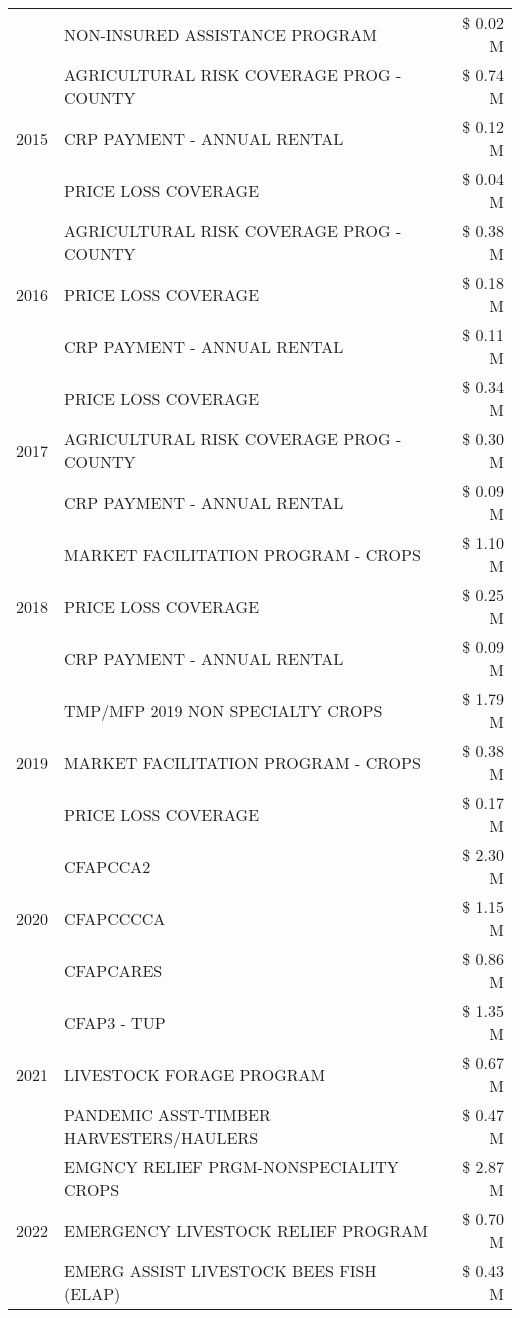 \begin{tabular}{llr}
 & NON-INSURED ASSISTANCE PROGRAM & \$ 0.02 M \\
\cline{1-3}
\multirow[t]{3}{*}{2015} & AGRICULTURAL RISK COVERAGE PROG - COUNTY & \$ 0.74 M \\
 & CRP PAYMENT - ANNUAL RENTAL & \$ 0.12 M \\
 & PRICE LOSS COVERAGE & \$ 0.04 M \\
\cline{1-3}
\multirow[t]{3}{*}{2016} & AGRICULTURAL RISK COVERAGE PROG - COUNTY & \$ 0.38 M \\
 & PRICE LOSS COVERAGE & \$ 0.18 M \\
 & CRP PAYMENT - ANNUAL RENTAL & \$ 0.11 M \\
\cline{1-3}
\multirow[t]{3}{*}{2017} & PRICE LOSS COVERAGE & \$ 0.34 M \\
 & AGRICULTURAL RISK COVERAGE PROG - COUNTY & \$ 0.30 M \\
 & CRP PAYMENT - ANNUAL RENTAL & \$ 0.09 M \\
\cline{1-3}
\multirow[t]{3}{*}{2018} & MARKET FACILITATION PROGRAM - CROPS & \$ 1.10 M \\
 & PRICE LOSS COVERAGE & \$ 0.25 M \\
 & CRP PAYMENT - ANNUAL RENTAL & \$ 0.09 M \\
\cline{1-3}
\multirow[t]{3}{*}{2019} & TMP/MFP 2019 NON SPECIALTY CROPS & \$ 1.79 M \\
 & MARKET FACILITATION PROGRAM - CROPS & \$ 0.38 M \\
 & PRICE LOSS COVERAGE & \$ 0.17 M \\
\cline{1-3}
\multirow[t]{3}{*}{2020} & CFAPCCA2 & \$ 2.30 M \\
 & CFAPCCCCA & \$ 1.15 M \\
 & CFAPCARES & \$ 0.86 M \\
\cline{1-3}
\multirow[t]{3}{*}{2021} & CFAP3 - TUP & \$ 1.35 M \\
 & LIVESTOCK FORAGE PROGRAM & \$ 0.67 M \\
 & PANDEMIC ASST-TIMBER HARVESTERS/HAULERS & \$ 0.47 M \\
\cline{1-3}
\multirow[t]{3}{*}{2022} & EMGNCY RELIEF PRGM-NONSPECIALITY CROPS & \$ 2.87 M \\
 & EMERGENCY LIVESTOCK RELIEF PROGRAM & \$ 0.70 M \\
 & EMERG ASSIST LIVESTOCK BEES FISH (ELAP) & \$ 0.43 M \\
\cline{1-3}
\bottomrule
\end{tabular}
